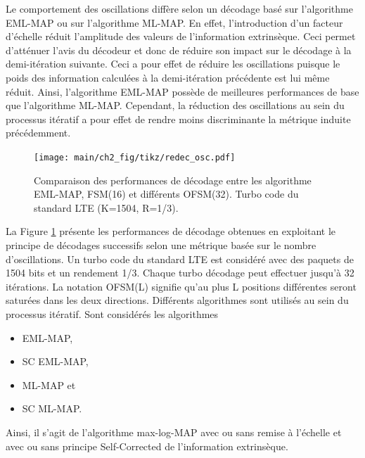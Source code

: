 Le comportement des oscillations diffère selon un décodage basé sur l'algorithme EML-MAP ou sur l'algorithme ML-MAP. En effet, 
l'introduction d'un facteur d'échelle réduit l'amplitude des valeurs de l'information extrinsèque. Ceci permet d'atténuer 
l'avis du décodeur et donc de réduire son impact sur le décodage à la demi-itération suivante. Ceci a pour effet de 
réduire les oscillations puisque le poids des information calculées à la demi-itération précédente est lui même réduit. 
Ainsi, l'algorithme EML-MAP possède de meilleures performances de base que l'algorithme ML-MAP. Cependant, la réduction 
des oscillations au sein du processus itératif a pour effet de rendre moins discriminante la métrique induite 
précédemment.

\begin{figure}[!h]
	\centering
	\texttt{[image: main/ch2\_fig/tikz/redec\_osc.pdf]}
	\vspace*{.3cm}
	\caption{\label{fig:cmp_osc}Comparaison des performances de décodage entre les algorithme EML-MAP, FSM(16) et différents OFSM(32). Turbo code du standard LTE (K=1504, R=1/3).}
\end{figure}

La Figure \ref{fig:cmp_osc} présente les performances de décodage obtenues en exploitant le principe de décodages successifs selon une 
métrique basée sur le nombre d'oscillations. Un turbo code du standard LTE est considéré avec des paquets de 1504 bits et un 
rendement 1/3. Chaque turbo décodage peut effectuer jusqu'à 32 itérations. La notation OFSM(L) signifie qu'au plus L 
positions différentes seront saturées dans les deux directions. Différents algorithmes sont utilisés au sein du
processus itératif. Sont considérés les algorithmes 
\begin{itemize}
 	\item EML-MAP,
 	\item SC EML-MAP,
 	\item ML-MAP et 
 	\item SC ML-MAP.
 \end{itemize} 
 Ainsi, il s'agit de l'algorithme 
max-log-MAP avec ou sans remise à l'échelle et avec ou sans principe Self-Corrected de l'information extrinsèque.

